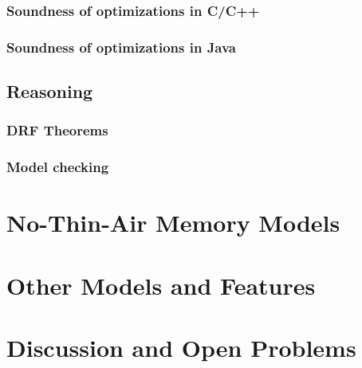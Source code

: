 \documentclass[a4paper,twoside,11pt]{article}
\numberwithin{equation}{section}
\begin{document}
\subsubsection{Soundness of optimizations in C/C++}

\subsubsection{Soundness of optimizations in Java}

\subsection{Reasoning}

\subsubsection{DRF Theorems}

\subsubsection{Model checking}

\section{No-Thin-Air Memory Models}

\section{Other Models and Features}



\section{Discussion and Open Problems}

 

\end{document}
